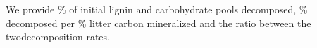 \documentclass[authoryear,preprint,review,12pt]{elsarticle}
\begin{document}
                                                                                                                                                                                                                                                                                                                                                                                                                                                                                                                                                                                                                                                                                                                                                                                                                                                                                                                                                                                                                                                                                                                              We provide \% of initial lignin and carbohydrate pools decomposed, \% decomposed per \% litter carbon mineralized and the ratio between the twodecomposition rates.
\end{document}
